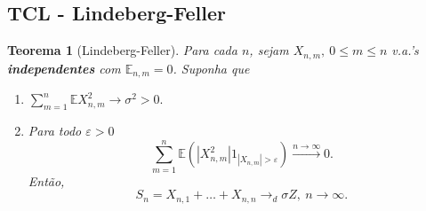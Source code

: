 \documentclass[12pt,a4paper,oneside]{book}
\newtheorem{theorem}{Teorema}[section]
\theoremstyle{definition}
\theoremstyle{remark}
\numberwithin{equation}{section}
\newcommand{\e}{\varepsilon}
\newcommand{\E}{\mathbb{E}}
\newcommand{\ds}{\displaystyle}
\newcommand{\rarrowlimn}{\xrightarrow{n\rightarrow \infty}}
\begin{document}
\subsection{TCL - Lindeberg-Feller}

\begin{tcolorbox}
\begin{theorem}[Lindeberg-Feller]\label{teo-central-LF} Para cada $n$, sejam $X_{n,m},\ 0\leq m\leq n$ v.a.'s \textbf{independentes} com $\E_{n,m}=0$. Suponha que
\begin{enumerate}
\item $\ds\sum^n_{m=1}\E X^2_{n,m} \rightarrow \sigma^2>0. $
\item Para todo $\e>0$
$$\sum_{m=1}^n \E(|X_{n,m}^2|1_{|X_{n,m}|>\e} ) \rarrowlimn 0.$$
Então, 
$$S_n = X_{n,1}+\dots+X_{n,n} \longrightarrow_d \sigma Z,\ n\rightarrow \infty.  $$
\end{enumerate} 
\end{theorem}
\end{tcolorbox}
\end{document}
